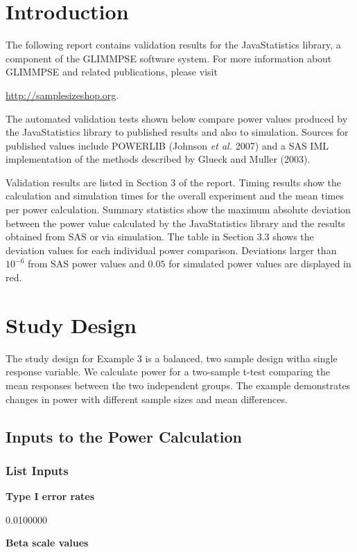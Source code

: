 \documentclass{glimmpse-report}
\begin{document}
\section{Introduction}
The following report contains validation results for the JavaStatistics library, a component of the GLIMMPSE software system.  For more information about GLIMMPSE and related publications, please visit

 

\href{http://samplesizeshop.org}{http://samplesizeshop.org}.

The automated validation tests shown below compare power values produced by the JavaStatistics library to published results and also to simulation.  Sources for published values include POWERLIB (Johnson \emph{et al.} 2007) and a SAS IML implementation of the methods described by Glueck and Muller (2003).

Validation results are listed in Section 3 of the report.  Timing results show the calculation and simulation times for the overall experiment and the mean times per power calculation.  Summary statistics show the maximum absolute deviation between the power value calculated by the JavaStatistics library and the results obtained from SAS or via simulation.  The table in Section 3.3 shows the deviation values for each individual power comparison.  Deviations larger than $10^{-6}$ from SAS power values and $0.05$ for simulated power values are displayed in red.

 \section{Study Design}
The study design for Example 3 is a balanced, two sample design witha single response variable. We calculate power for a two-sample t-test comparing the mean responses between the two independent groups.  The example demonstrates changes in power with different sample sizes and mean differences.
\subsection{Inputs to the Power Calculation}
\subsubsection{List Inputs}

{\bf Type I error rates}

0.0100000

{\bf Beta scale values}
\end{document}
